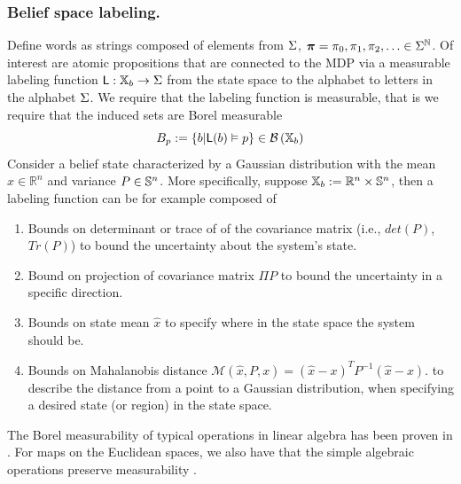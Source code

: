 \documentclass{ifacconf}
\begin{document}
    
    
	\subsubsection{Belief space labeling.}\label{sec:DTL}  
Define words as strings composed of elements from $\alphabeth$, $\word=\letter_0,\letter_1,\letter_2,\ldots\in\alphabeth^{\mathbb{N}}$.
Of interest are atomic propositions that are connected to the MDP via a measurable labeling function $\Lab:\Xb\rightarrow \alphabeth$ from the state space to the alphabet to letters in the alphabet $\alphabeth$. 
We require that the labeling function is measurable, that is we require that the induced sets  are Borel measurable
\[B_p:=\{b|\Lab(b)\vDash p \}\in \borel{\Xb}\]      
Consider a belief state characterized by  a Gaussian distribution with the mean $\hat x\in \mathbb R^n $ and variance $P\in\S^n$. %
 More specifically, suppose  $\Xb:=\mathbb R^n\times \S^n$,  then a labeling function  can be for example composed of %
     \begin{enumerate}
 	\item Bounds on determinant or trace of of the covariance matrix (i.e., $det(P)$, $Tr(P)$) to  bound the uncertainty about the system's state.
 	\item Bound on projection of covariance matrix $\Pi P$ to bound the uncertainty in a specific direction.
   \item   Bounds on state mean $\hat{x}$ to specify
    where in the state space the system should be. 
    \item Bounds on Mahalanobis distance $\mathcal{M}(\hat{x},P,x) = (\hat{x}-x)^TP^{-1}(\hat{x}-x)$.
    to describe the distance from a point to a Gaussian distribution, when specifying a desired state (or region) in the state space. 
    \end{enumerate}
 
    The Borel measurability of typical operations in linear algebra has been proven in \citep{azoff1974borel}.
For maps on the Euclidean spaces, we also have that the simple algebraic operations  preserve measurability \citep[page 116]{lang1993real}.
 
\end{document}
